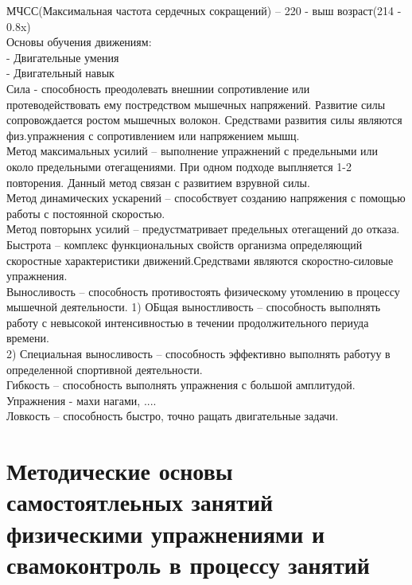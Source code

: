 \documentclass[a4paper, 12pt]{article}
\begin{document}
МЧСС(Максимальная частота сердечных сокращений) -- 220 - выш возраст(214 - 0.8x)\\

Основы обучения движениям:\\
- Двигательные умения\\
- Двигательный навык\\


Сила - способность преодолевать внешнии сопротивление или протеводействовать ему постредством мышечных напряжений. Развитие силы сопровождается ростом мышечных волокон. Средствами развития силы являются физ.упражнения с сопротивлением или напряжением мышц.\\
Метод максимальных усилий -- выполнение упражнений с предельными или около предельными отегащениями. При одном подходе выплняется 1-2 повторения. Данный метод связан с развитием взрувной силы.\\
Метод динамических ускарений -- способствует созданию напряжения с помощью работы с постоянной скоростью.\\
Метод повторынх усилий -- предустматривает предельных отегащений до отказа.\\

Быстрота -- комплекс функциональных свойств организма определяющий скоростные характеристики движений.Средствами являются скоростно-силовые упражнения.\\

Выносливость -- способность противостоять физическому утомлению в процессу мышечной деятельности. 
1) ОБщая выностливость -- способность выполнять работу с невысокой интенсивностью в течении продолжительного периуда времени.\\
2) Специальная выносливость -- способность эффективно выполнять работуу в определенной спортивной деятельности.\\

Гибкость -- способность выполнять упражнения с большой амплитудой.\\
Упражнения - махи нагами, ....\\

Ловкость -- способность быстро, точно ращать двигательные задачи.\\

\section{Методические основы самостоятлеьных занятий физическими упражнениями и свамоконтроль в процессу занятий}
\end{document}
